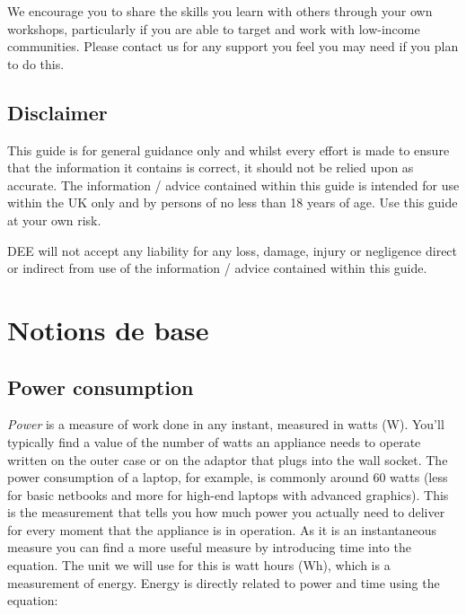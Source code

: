 \documentclass{article}
\theoremstyle{definition}
\theoremstyle{definition}
\theoremstyle{remark}
\begin{document}
    We encourage you to share the skills you learn with others through your own workshops, particularly if you are able to target and work with low-income communities. Please contact us for any support you feel you may need if you plan to do this.


  {\color{blue}\subsection{Disclaimer}} %
  \label{sub:disclaimer}

    This guide is for general guidance only and whilst every effort is made to ensure that the information it contains is correct, it should not be relied upon as accurate. The information / advice contained within this guide is intended for use within the UK only and by persons of no less than 18 years of age. Use this guide at your own risk.

    DEE will not accept any liability for any loss, damage, injury or negligence direct or indirect from use of the information / advice contained within this guide.


  \newpage  


{\color{blue}\section{Notions de base}} %
\label{sec:notions_de_base}

  {\color{blue}\subsection{Power consumption}} %
  \label{sub:power_consumption}

    \textit{Power} is a measure of  work done in any instant, measured in watts (W). You'll typically find a value of the number of watts an appliance needs to operate written on the outer case or on the adaptor that plugs into the wall socket. The power consumption of a laptop, for example, is commonly around 60 watts (less for basic netbooks and more for high-end laptops with advanced graphics). This is the measurement that tells you how much power you actually need to deliver for every moment that the appliance is in operation. As it is an instantaneous measure you can find a more useful measure by introducing time into the equation. The unit we will use for this is watt hours (Wh), which is a measurement of energy. Energy is directly related to power and time using the equation:
\end{document}
